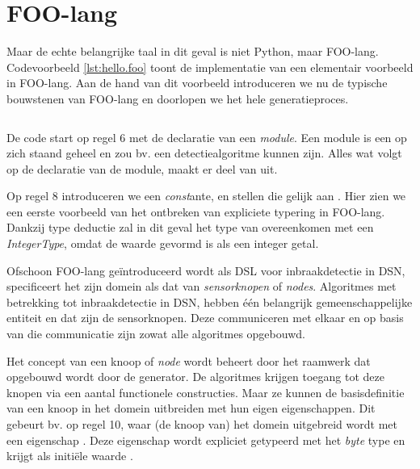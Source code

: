 
\section{FOO-lang}
\label{section:devel-foo-lang}

Maar de echte belangrijke taal in dit geval is niet Python, maar FOO-lang.
Codevoorbeeld \ref{lst:hello.foo} toont de implementatie van een elementair voorbeeld
in FOO-lang. Aan de hand van dit voorbeeld introduceren we nu de typische
bouwstenen van FOO-lang en doorlopen we het hele generatieproces.

\inputminted[linenos,frame=lines,framesep=2mm,fontsize=\footnotesize]{js}{../src/foo-lang/examples/hello.foo}
\vspace{-5mm}
\vspace{3mm}

De code start op regel 6 met de declaratie van een \emph{module}. Een module is
een op zich staand geheel en zou bv. een detectiealgoritme kunnen zijn. Alles
wat volgt op de declaratie van de module, maakt er deel van uit.

Op regel 8 introduceren we een \emph{const}ante,  en stellen die
gelijk aan . Hier zien we een eerste voorbeeld van het ontbreken van
expliciete typering in FOO-lang. Dankzij type deductie zal in dit geval het
type van  overeenkomen met een \emph{IntegerType}, omdat de
waarde  gevormd is als een integer getal.

Ofschoon FOO-lang ge\"introduceerd wordt als DSL voor inbraakdetectie in DSN,
specificeert het zijn domein als dat van \emph{sensorknopen} of \emph{nodes}.
Algoritmes met betrekking tot inbraakdetectie in DSN, hebben \'e\'en belangrijk
gemeenschappelijke entiteit en dat zijn de sensorknopen. Deze communiceren met
elkaar en op basis van die communicatie zijn zowat alle algoritmes opgebouwd.

Het concept van een knoop of \emph{node} wordt beheert door het raamwerk dat
opgebouwd wordt door de generator. De algoritmes krijgen toegang tot deze
knopen via een aantal functionele constructies. Maar ze kunnen de
basisdefinitie van een knoop in het domein uitbreiden met hun eigen
eigenschappen. Dit gebeurt bv. op regel 10, waar (de knoop van) het domein
uitgebreid wordt met een eigenschap . Deze eigenschap wordt
expliciet getypeerd met het \emph{byte} type en krijgt als initi\"ele waarde
.

